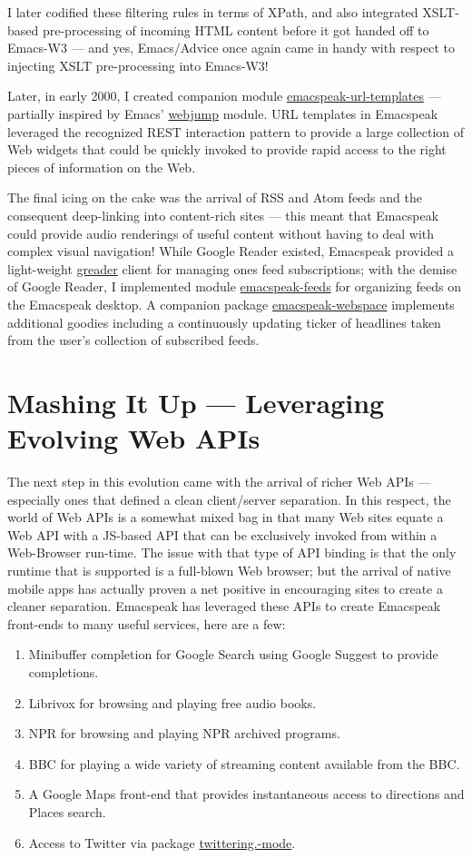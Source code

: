 \documentclass[11pt]{article}
\begin{document}
I later codified these filtering rules in terms of XPath, and
also integrated XSLT-based pre-processing of incoming HTML
content before it got handed off to Emacs-W3 — and yes,
Emacs/Advice once again came in handy with respect to injecting
XSLT pre-processing into Emacs-W3!

Later, in early 2000, I created companion module
\uline{emacspeak-url-templates} — partially inspired by Emacs'
\uline{webjump} module. URL templates in Emacspeak leveraged the
recognized REST interaction pattern to provide a large collection
of Web widgets that could be quickly invoked to provide rapid
access to the right pieces of information on the Web.

The final icing on the cake was the arrival of RSS and Atom feeds
and the consequent deep-linking into content-rich sites — this
meant that Emacspeak could provide audio renderings of useful
content without having to deal with complex visual navigation!
While Google Reader existed, Emacspeak provided a light-weight
\uline{greader} client for managing ones feed subscriptions; with the
demise of Google Reader, I implemented module \uline{emacspeak-feeds}
for organizing feeds on the Emacspeak desktop. A companion
package \uline{emacspeak-webspace} implements additional goodies
including a continuously updating ticker of headlines taken from
the user's collection of subscribed feeds.


\section{Mashing It Up —  Leveraging Evolving Web APIs}
\label{sec-15}

The next step in this evolution came with the arrival of richer
Web APIs — especially ones that defined a clean client/server
separation. In this respect, the world of Web APIs is a somewhat
mixed bag in that many Web sites equate a Web API with a JS-based
API that can be exclusively invoked from within a Web-Browser
run-time. The issue with that type of API binding is that the
only runtime that is supported is a full-blown Web browser; but
the arrival of native mobile apps has actually proven a net
positive in encouraging sites to create a cleaner
separation. Emacspeak has leveraged these APIs to create
Emacspeak front-ends to many useful services, here are a few:

\begin{enumerate}
\item Minibuffer completion for Google Search using Google Suggest
to provide completions.
\item Librivox for browsing  and playing free audio books.
\item NPR  for browsing and playing NPR archived programs.
\item BBC for playing a wide variety of streaming content
available from the BBC.
\item A Google Maps front-end that  provides instantaneous access
to directions and Places search.
\item Access to Twitter via package \uline{twittering.-mode}.
\end{enumerate}
\end{document}

